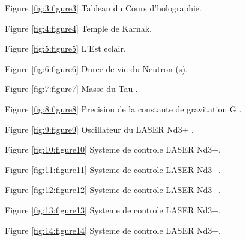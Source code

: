 \documentclass[a4paper,12pt]{article}
\begin{document}
Figure \ref{fig:3:figure3} Tableau du Cours d'holographie.

Figure \ref{fig:4:figure4} Temple de Karnak.

Figure \ref{fig:5:figure5} L'Est eclair.

Figure \ref{fig:6:figure6} Duree de vie du Neutron (s).

Figure \ref{fig:7:figure7} Masse du Tau .

Figure \ref{fig:8:figure8} Precision de la constante de gravitation G \cite{Wu}.

Figure \ref{fig:9:figure9} Oscillateur du LASER Nd3+ \cite{Lecompte}.

Figure \ref{fig:10:figure10} Systeme de controle  LASER Nd3+.

Figure \ref{fig:11:figure11} Systeme de controle  LASER Nd3+.

Figure \ref{fig:12:figure12} Systeme de controle  LASER Nd3+.

Figure \ref{fig:13:figure13} Systeme de controle  LASER Nd3+.

Figure \ref{fig:14:figure14} Systeme de controle  LASER Nd3+.
\end{document}
